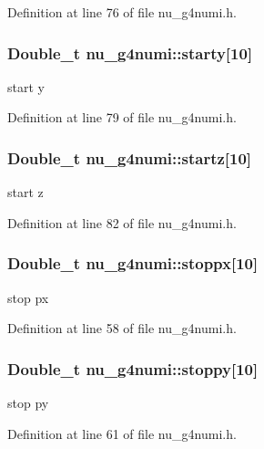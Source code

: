 Definition at line 76 of file nu\-\_\-g4numi.\-h.

\hypertarget{classnu__g4numi_a58d39dbb466f353155aca6a6e7a2cc12}{
\subsubsection[{starty}]{\setlength{\rightskip}{0pt plus 5cm}Double\-\_\-t nu\-\_\-g4numi\-::starty\mbox{[}10\mbox{]}}}\label{classnu__g4numi_a58d39dbb466f353155aca6a6e7a2cc12}
start y 

Definition at line 79 of file nu\-\_\-g4numi.\-h.

\hypertarget{classnu__g4numi_afc1991c5be450f31577f4e1d31dceb2f}{
\subsubsection[{startz}]{\setlength{\rightskip}{0pt plus 5cm}Double\-\_\-t nu\-\_\-g4numi\-::startz\mbox{[}10\mbox{]}}}\label{classnu__g4numi_afc1991c5be450f31577f4e1d31dceb2f}
start z 

Definition at line 82 of file nu\-\_\-g4numi.\-h.

\hypertarget{classnu__g4numi_a54b6004629ee3afa4f5e06b258def720}{
\subsubsection[{stoppx}]{\setlength{\rightskip}{0pt plus 5cm}Double\-\_\-t nu\-\_\-g4numi\-::stoppx\mbox{[}10\mbox{]}}}\label{classnu__g4numi_a54b6004629ee3afa4f5e06b258def720}
stop px 

Definition at line 58 of file nu\-\_\-g4numi.\-h.

\hypertarget{classnu__g4numi_a74c6c24c0fcad6777bedb8ba6a0e3787}{
\subsubsection[{stoppy}]{\setlength{\rightskip}{0pt plus 5cm}Double\-\_\-t nu\-\_\-g4numi\-::stoppy\mbox{[}10\mbox{]}}}\label{classnu__g4numi_a74c6c24c0fcad6777bedb8ba6a0e3787}
stop py 

Definition at line 61 of file nu\-\_\-g4numi.\-h.

